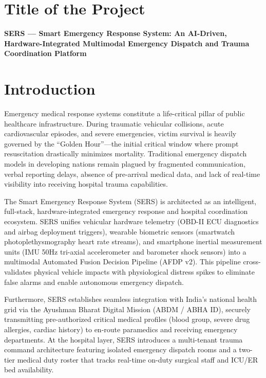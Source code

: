 \documentclass[12pt,a4paper]{article}
\begin{document}
\tableofcontents

\clearpage
\section{Title of the Project}
\textbf{SERS — Smart Emergency Response System: An AI-Driven, Hardware-Integrated Multimodal Emergency Dispatch and Trauma Coordination Platform}

\vspace{0.4cm}

\section{Introduction}
Emergency medical response systems constitute a life-critical pillar of public healthcare infrastructure. During traumatic vehicular collisions, acute cardiovascular episodes, and severe emergencies, victim survival is heavily governed by the ``Golden Hour''—the initial critical window where prompt resuscitation drastically minimizes mortality. Traditional emergency dispatch models in developing nations remain plagued by fragmented communication, verbal reporting delays, absence of pre-arrival medical data, and lack of real-time visibility into receiving hospital trauma capabilities.

The Smart Emergency Response System (SERS) is architected as an intelligent, full-stack, hardware-integrated emergency response and hospital coordination ecosystem. SERS unifies vehicular hardware telemetry (OBD-II ECU diagnostics and airbag deployment triggers), wearable biometric sensors (smartwatch photoplethysmography heart rate streams), and smartphone inertial measurement units (IMU 50Hz tri-axial accelerometer and barometer shock sensors) into a multimodal Automated Fusion Decision Pipeline (AFDP v2). This pipeline cross-validates physical vehicle impacts with physiological distress spikes to eliminate false alarms and enable autonomous emergency dispatch.

Furthermore, SERS establishes seamless integration with India's national health grid via the Ayushman Bharat Digital Mission (ABDM / ABHA ID), securely transmitting pre-authorized critical medical profiles (blood group, severe drug allergies, cardiac history) to en-route paramedics and receiving emergency departments. At the hospital layer, SERS introduces a multi-tenant trauma command architecture featuring isolated emergency dispatch rooms and a two-tier medical duty roster that tracks real-time on-duty surgical staff and ICU/ER bed availability.
\end{document}
